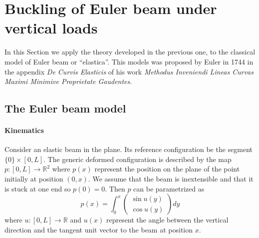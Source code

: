 \documentclass[a4paper,11pt]{article}
\theoremstyle{definition}
\begin{document}
\section{Buckling of Euler beam under vertical loads}
\label{sec:euler-beam}

In this Section we apply the theory developed in the previous one, to the classical model of Euler beam or ``elastica''. This models was proposed by Euler in 1744 in the appendix \emph{De Curvis Elasticis} of his work \emph{Methodus Inveniendi Lineas Curvas Maximi Minimive Proprietate Gaudentes}.

\subsection{The Euler beam model}

\paragraph{Kinematics} Consider an elastic beam in the plane. Its reference configuration be the segment $\{0\}\times[0,L]$. The generic deformed configuration is described by the map $p\colon[0,L]\to\mathbb{R}^2$ where $p(x)$ represent the position on the plane of the point initially at position $(0,x)$. We assume that the beam is inextensible and that it is stuck at one end so $p(0)=0$. Then $p$ can be parametrized as
\[
p(x)=\int_0^x
\begin{pmatrix}
\sin u(y) \\
\cos u(y)
\end{pmatrix}
dy
\]
where $u\colon[0,L]\to\mathbb{R}$ and $u(x)$ represent the angle between the vertical direction and the tangent unit vector to the beam at position $x$.
\end{document}
